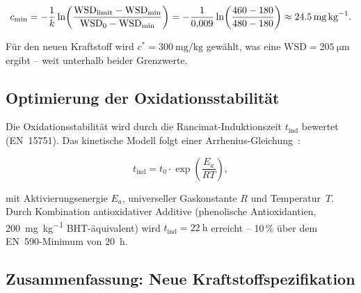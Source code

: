 ﻿\documentclass[12pt,a4paper]{article}
\newcommand{\WSD}{\ensuremath{\mathrm{WSD}}}
\begin{document}
\begin{equation}
  c_{\min} = -\frac{1}{k} \ln\!\left(\frac{\WSD_{\mathrm{limit}} - \WSD_{\min}}
  {\WSD_0 - \WSD_{\min}}\right)
  = -\frac{1}{0{,}009} \ln\!\left(\frac{460-180}{480-180}\right)
  \approx \SI{24{,}5}{\mg\per\kg}.
\end{equation}

Für den neuen Kraftstoff wird $c^* = \SI{300}{\mg\per\kg}$ gewählt,
was eine $\WSD = \SI{205}{\micro\m}$ ergibt -- weit unterhalb beider Grenzwerte.

\subsection{Optimierung der Oxidationsstabilität}
\label{sec:kraftstoff_oxidation}

Die Oxidationsstabilität wird durch die Rancimat-Induktionszeit $t_{\mathrm{ind}}$
bewertet (EN~15751). Das kinetische Modell folgt einer Arrhenius-Gleichung~\cite{schober2006}:

\begin{equation}
  t_{\mathrm{ind}} = t_0 \cdot \exp\!\left(\frac{E_a}{R T}\right),
  \label{eq:arrhenius_ind}
\end{equation}

mit Aktivierungsenergie $E_a$, universeller Gaskonstante $R$ und Temperatur~$T$.
Durch Kombination antioxidativer Additive (phenolische Antioxidantien,
\SI{200}{\mg\per\kg} BHT-äquivalent) wird $t_{\mathrm{ind}} = \SI{22}{\hour}$
erreicht -- 10\,\% über dem EN~590-Minimum von \SI{20}{\hour}.

\subsection{Zusammenfassung: Neue Kraftstoffspezifikation}
\label{sec:kraftstoff_spezifikation}
\end{document}
